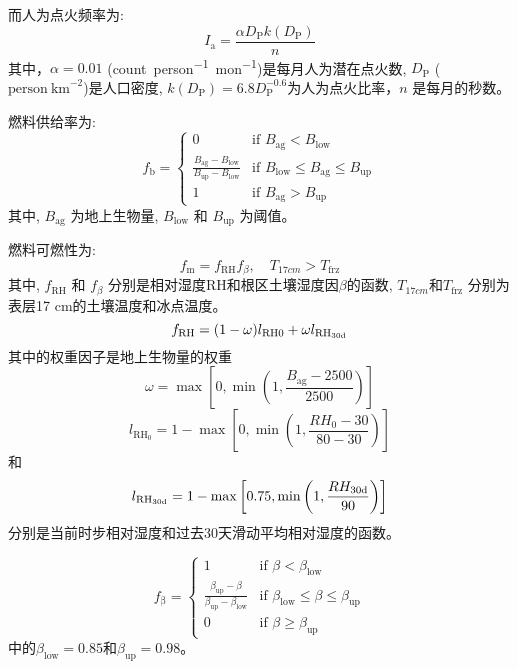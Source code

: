 而人为点火频率为:
\begin{equation}
I_{\mathrm{a}}=\frac{\alpha D_{\mathrm{P}} k\left(D_{\mathrm{P}}\right)}{n}
\end{equation}
其中，$\alpha=0.01$ (\unit{count.person^{-1}.mon^{-1}})是每月人为潜在点火数, $D_{\mathrm {P}} $ ($\text{person}~\text{km}^{-2}$)是人口密度, $k\left(D_{\mathrm{P}}\right)=6.8D_{\mathrm {P}} ^{-0.6}$为人为点火比率，$n$ 是每月的秒数。

燃料供给率为:
\begin{equation}
  f_{\mathrm {b}}  = \begin{cases}
    0 & \text{if } B_{\mathrm{ag}} < B_{\text{low}}\\
    \frac{B_{\mathrm{ag}}-B_{\mathrm{low}}}{B_{\mathrm{up}}-B_{\mathrm{low}}} & \text{if } B_{\mathrm{low}} \leqslant B_{\mathrm{ag}} \leqslant B_{\mathrm{up}}\\
    1 & \text{if } B_{\mathrm{ag}} > B_{\mathrm{up}}
  \end{cases}
\end{equation}
其中, $B_{\mathrm{ag}}$ 为地上生物量, $B_{\mathrm{low}}$ 和 $B_{\mathrm{up}}$ 为阈值。

燃料可燃性为:
\begin{equation}
  f_{\mathrm {m}}  = f_{\mathrm{RH}} f_{\beta},\quad T_{17cm}>T_{\mathrm {frz}}
\end{equation}
其中, $f_{\mathrm{RH}}$ 和 $f_{\beta}$ 分别是相对湿度${\mathrm {RH}}$和根区土壤湿度因$\beta$的函数, $T_{17cm}$和$T_{\mathrm{frz}}$ 分别为表层17 cm的土壤温度和冰点温度。
%
\begin{equation}
  f_{\mathrm{RH}} = (1-\omega)l_{\mathrm{RH0}}+\omega l_{\mathrm{RH_{\rm 30d}}}
\end{equation}
其中的权重因子是地上生物量的权重 $$\omega=\max\left[0, \min\left(1, \frac{B_{\mathrm{ag}} - 2500}{2500}\right)\right]$$
$$l_{\mathrm{RH_0}}=1-\max\left[0, \min\left(1, \frac{RH_{\mathrm{0}} - 30}{80-30}\right)\right]$$
和
$$l_{\mathrm{RH_{\rm 30d}}}=1-\max\left[0.75, \min\left(1, \frac{RH_{\rm 30d}}{90}\right)\right]$$
分别是当前时步相对湿度和过去30天滑动平均相对湿度的函数。

\begin{equation}
  f_{\mathrm {\beta}}  = \begin{cases}
    1 & \text{if } \beta < \beta_{\mathrm{low}}\\
    \frac{\beta_{\mathrm{up}}-\beta}{\beta_{\mathrm{up}}-\beta_{\mathrm{low}}} & \text{if } \beta_{\mathrm{low}} \leqslant \beta \leqslant \beta_{\mathrm{up}}\\
    0 & \text{if } \beta \geqslant \beta_{\mathrm{up}}
  \end{cases}
\end{equation}
中的$\beta_{\mathrm{low}}=0.85$和$\beta_{\mathrm{up}}=0.98$。


